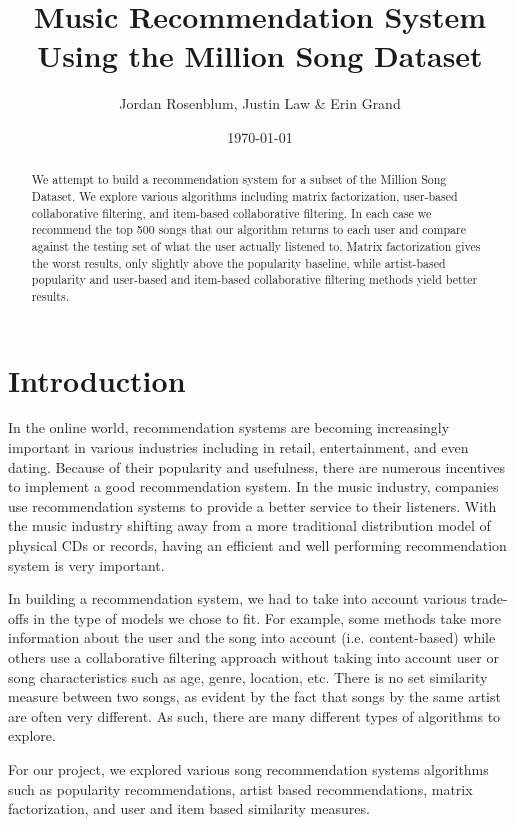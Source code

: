 \documentclass[12pt,preprint]{aastex}
\begin{document}
\title{Music Recommendation System Using the Million Song Dataset}

 \author{Jordan Rosenblum, Justin Law \& Erin Grand}
 
\date{\today}             

\begin{abstract}
We attempt to build a recommendation system for a subset of the Million Song Dataset. We explore various algorithms including matrix factorization, user-based collaborative filtering, and item-based collaborative filtering. In each case we recommend the top 500 songs that our algorithm returns to each user and compare against the testing set of what the user actually listened to. Matrix factorization gives the worst results, only slightly above the popularity baseline, while artist-based popularity and user-based and item-based collaborative filtering methods yield better results.
\end{abstract}

\tableofcontents

\section{Introduction}
In the online world, recommendation systems are becoming increasingly important in various industries including in retail, entertainment, and even dating. 
Because of their popularity and usefulness, there are numerous incentives to implement a good recommendation system. 
In the music industry, companies use recommendation systems to provide a better service to their listeners. 
With the music industry shifting away from a more traditional distribution model of physical CDs or records, 
having an efficient and well performing recommendation system is very important. 

In building a recommendation system, we had to take into account various trade-offs in the type of models we chose to fit. For example, some methods take more information about the user and the song into account (i.e. content-based) while others use a collaborative filtering approach without taking into account user or song characteristics such as age, genre, location, etc.
There is no set similarity measure between two songs, as evident by the fact that songs by the same artist are often very different. As such, there are many different types of algorithms to explore. 

For our project, we explored various song recommendation systems algorithms such as popularity recommendations, artist based recommendations, matrix factorization, and user and item based similarity measures.  
\end{document}
